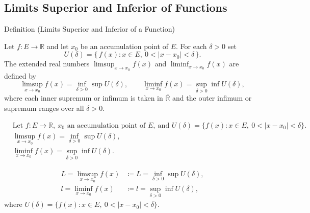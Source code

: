 
\subsection*{Limits Superior and Inferior of Functions}
\label{sec:limsup-liminf-functions}
\begin{definitionbox}{Definition (Limits Superior and Inferior of a Function)}
\begin{definition}
\label{def:limsup-liminf-function}
Let $f:E\to\mathbb{R}$ and let $x_0$ be an accumulation point of $E$. For each $\delta>0$ set
\[
U(\delta)=\{\,f(x): x\in E,\ 0<|x-x_0|<\delta\,\}.
\]
The extended real numbers $\limsup_{x\to x_0} f(x)$ and $\liminf_{x\to x_0} f(x)$ are defined by
\[
\limsup_{x\to x_0} f(x)=\inf_{\delta>0}\sup U(\delta),
\qquad
\liminf_{x\to x_0} f(x)=\sup_{\delta>0}\inf U(\delta),
\]
where each inner supremum or infimum is taken in $\overline{\mathbb{R}}$ and the outer infimum or supremum ranges over all $\delta>0$.
\end{definition}
\end{definitionbox}

\begin{remark*}
\[
\begin{aligned}
&\text{Let } f:E\to\mathbb{R},\ x_0 \text{ an accumulation point of } E,\ \text{and } U(\delta)=\{f(x):x\in E,\ 0<|x-x_0|<\delta\}.\\
&\limsup_{x\to x_0} f(x)=\inf_{\delta>0}\sup U(\delta),\\
&\liminf_{x\to x_0} f(x)=\sup_{\delta>0}\inf U(\delta).
\end{aligned}
\]
\end{remark*}

\begin{remark*}
\[
\begin{aligned}
L=\limsup_{x\to x_0} f(x) &\coloneqq L=\inf_{\delta>0}\sup U(\delta),\\
l=\liminf_{x\to x_0} f(x) &\coloneqq l=\sup_{\delta>0}\inf U(\delta),
\end{aligned}
\]
where $U(\delta)=\{f(x):x\in E,\ 0<|x-x_0|<\delta\}$.
\end{remark*}

